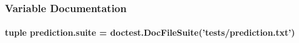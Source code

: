 \subsubsection{Variable Documentation}
\hypertarget{namespaceprediction_aeaf552318c37578eb6753c31c046d446}{
\paragraph[{suite}]{\setlength{\rightskip}{0pt plus 5cm}tuple prediction.\-suite = doctest.\-Doc\-File\-Suite('tests/prediction.\-txt')}}\label{namespaceprediction_aeaf552318c37578eb6753c31c046d446}
